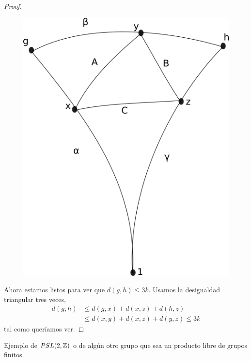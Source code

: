 \documentclass[tesis.tex]{subfiles}
\begin{document}
\begin{proof}
\begin{figure}[H]
	\centering
	\includegraphics[scale=0.5]{treewidth.png}
	\caption*{}
\end{figure}



Ahora estamos listos para ver que $d(g,h) \le 3k$. Usamos la desigualdad triangular tres veces,
\begin{align*}
	d(g,h) & \le d(g,x) + d(x,z) + d(h,z) \\
	& \le d(x,y) + d(x,z) + d(y,z) \le 3k
\end{align*}
tal como queríamos ver.
\end{proof}

\begin{ej}
	Ejemplo de $PSL(2,\mathbb{Z})$ o de algún otro grupo que sea un producto libre de grupos finitos.
\end{ej}
\end{document}
